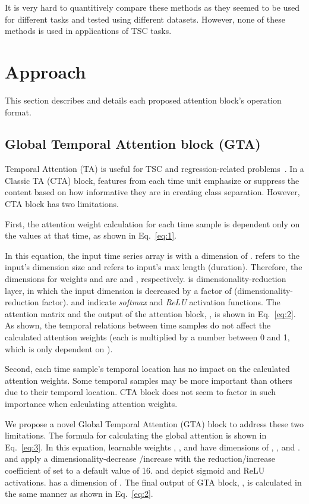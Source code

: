 \documentclass[journal]{IEEEtran}
\begin{document}
It is very hard to quantitively compare these methods as they seemed to be used for different tasks and tested using different datasets. However, none of these methods is used in applications of TSC tasks. 

\section{Approach}
This section describes and details each proposed attention block's operation format.
\subsection{Global Temporal Attention block (GTA)}
Temporal Attention (TA) is useful for TSC and regression-related problems~\cite{doughty2019pros, zeng2020hybrid, xu2019learning}. In a Classic TA (CTA) block, features from each time unit emphasize or suppress the content based on how informative they are in creating class separation. However, CTA block has two limitations. 

First, the attention weight calculation for each time sample is dependent only on the values at that time, as shown in Eq.~\eqref{eq:1}.

In this equation, the input time series array is  with a dimension of .  refers to the input's dimension size and  refers to input's max length (duration). Therefore, the dimensions for weights  and  are  and , respectively.  is dimensionality-reduction layer, in which the input dimension  is decreased by a factor of  (dimensionality-reduction factor).
 and  indicate \textit{softmax} and \textit{ReLU} activation functions. The attention matrix  and the output of the attention block, , is shown in Eq.~\eqref{eq:2}.\\

As shown, the temporal relations between time samples do not affect the calculated attention weights (each  is multiplied by a number between 0 and 1, which is only dependent on ).

Second, each time sample's temporal location has no impact on the calculated attention weights. Some temporal samples may be more important than others due to their temporal location. CTA block does not seem to factor in such importance when calculating attention weights. 

We propose a novel Global Temporal Attention (GTA) block to address these two limitations. The formula for calculating the global attention is shown in Eq.~\eqref{eq:3}. In this equation, learnable weights , , and  have dimensions of , , and .  and  apply a dimensionality-decrease /increase with the reduction/increase coefficient of  set to a default value of 16.  and  depict sigmoid and ReLU activations.  has a dimension of . The final output of GTA block, , is calculated in the same manner as shown in Eq.~\eqref{eq:2}.
\end{document}

